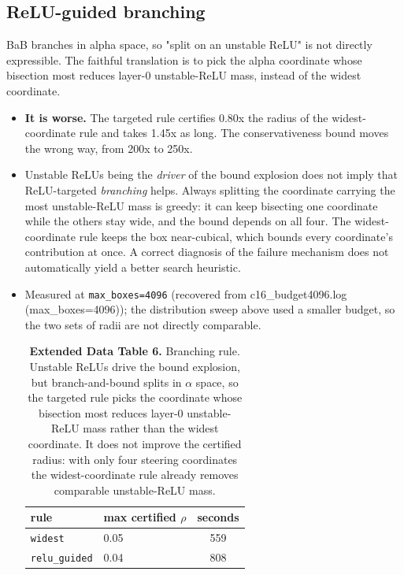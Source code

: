\documentclass[sn-nature,pdflatex]{sn-jnl}
\begin{document}
\subsection{ReLU-guided branching}
BaB branches in alpha space, so "split on an unstable ReLU" is not directly expressible. The faithful translation is to pick the alpha coordinate whose bisection most reduces layer-0 unstable-ReLU mass, instead of the widest coordinate.
\begin{itemize}
\item \textbf{It is worse.} The targeted rule certifies 0.80x the radius of the widest-coordinate rule and takes 1.45x as long. The conservativeness bound moves the wrong way, from 200x to 250x.
\item Unstable ReLUs being the \emph{driver} of the bound explosion does not imply that ReLU-targeted \emph{branching} helps. Always splitting the coordinate carrying the most unstable-ReLU mass is greedy: it can keep bisecting one coordinate while the others stay wide, and the bound depends on all four. The widest-coordinate rule keeps the box near-cubical, which bounds every coordinate's contribution at once. A correct diagnosis of the failure mechanism does not automatically yield a better search heuristic.
\item Measured at \texttt{max\_boxes=4096} (recovered from c16\_budget4096.log (max\_boxes=4096)); the distribution sweep above used a smaller budget, so the two sets of radii are not directly comparable.

\begin{table}[t]
\centering
\caption*{\textbf{Extended Data Table 6.} Branching rule. Unstable ReLUs drive the bound explosion, but branch-and-bound splits in $\alpha$ space, so the targeted rule picks the coordinate whose bisection most reduces layer-0 unstable-ReLU mass rather than the widest coordinate. It does not improve the certified radius: with only four steering coordinates the widest-coordinate rule already removes comparable unstable-ReLU mass.}
\label{edtab:branching}
\begin{tabular}{l l S[table-format=4.0]}
\toprule
rule & {max certified $\rho$} & {seconds} \\
\midrule
\texttt{widest} & 0.05 & 559 \\
\texttt{relu\_guided} & 0.04 & 808 \\
\bottomrule
\end{tabular}
\end{table}

\end{itemize}
\end{document}
